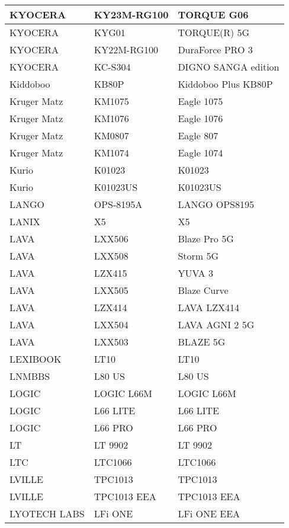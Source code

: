 \begin{tabularx}{\linewidth}{|l|X|X|}
        KYOCERA & KY23M-RG100 & TORQUE G06 \\ \hline
        KYOCERA & KYG01 & TORQUE(R) 5G \\ \hline
        KYOCERA & KY22M-RG100 & DuraForce PRO 3 \\ \hline
        KYOCERA & KC-S304 & DIGNO SANGA edition \\ \hline
        Kiddoboo & KB80P & Kiddoboo Plus KB80P \\ \hline
        Kruger Matz & KM1075 & Eagle 1075 \\ \hline
        Kruger Matz & KM1076 & Eagle 1076 \\ \hline
        Kruger Matz & KM0807 & Eagle 807 \\ \hline
        Kruger Matz & KM1074 & Eagle 1074 \\ \hline
        Kurio & K01023 & K01023 \\ \hline
        Kurio & K01023US & K01023US \\ \hline
        LANGO & OPS-8195A & LANGO OPS8195 \\ \hline
        LANIX & X5 & X5 \\ \hline
        LAVA & LXX506 & Blaze Pro 5G \\ \hline
        LAVA & LXX508 & Storm 5G \\ \hline
        LAVA & LZX415 & YUVA 3 \\ \hline
        LAVA & LXX505 & Blaze Curve \\ \hline
        LAVA & LZX414 & LAVA LZX414 \\ \hline
        LAVA & LXX504 & LAVA AGNI 2 5G \\ \hline
        LAVA & LXX503 & BLAZE 5G \\ \hline
        LEXIBOOK & LT10 & LT10 \\ \hline
        LNMBBS & L80 US & L80 US \\ \hline
        LOGIC & LOGIC L66M & LOGIC L66M \\ \hline
        LOGIC & L66 LITE & L66 LITE \\ \hline
        LOGIC & L66 PRO & L66 PRO \\ \hline
        LT & LT 9902 & LT 9902 \\ \hline
        LTC & LTC1066 & LTC1066 \\ \hline
        LVILLE & TPC1013 & TPC1013 \\ \hline
        LVILLE & TPC1013 EEA & TPC1013 EEA \\ \hline
        LYOTECH LABS & LFi ONE & LFi ONE EEA \\ \hline

\end{tabularx}
